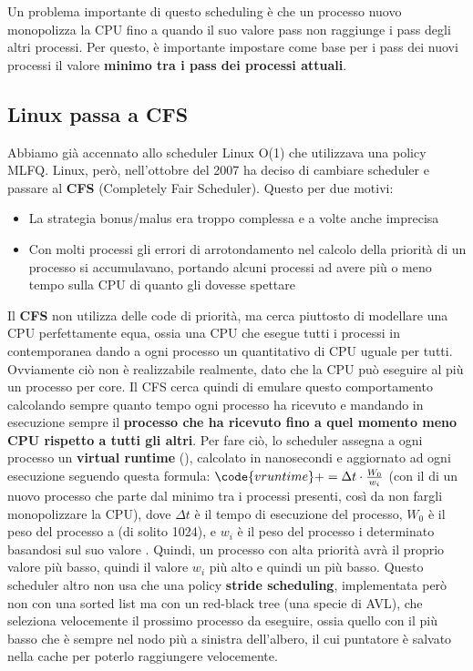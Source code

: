 \documentclass[11pt, a4paper, titlepage, oneside]{scrbook}
\begin{document}
Un problema importante di questo scheduling è che un processo nuovo monopolizza la CPU fino a quando il suo valore pass non raggiunge i pass degli altri processi. Per questo, è importante impostare come base per i pass dei nuovi processi il valore \textbf{minimo tra i pass dei processi attuali}.

\subsection{Linux passa a CFS}

Abbiamo già accennato allo scheduler Linux O(1) che utilizzava una policy MLFQ. Linux, però, nell'ottobre del 2007 ha deciso di cambiare scheduler e passare al \textbf{CFS} (Completely Fair Scheduler). Questo per due motivi:
\begin{itemize}
    \item La strategia bonus/malus era troppo complessa e a volte anche imprecisa
    \item Con molti processi gli errori di arrotondamento nel calcolo della priorità di un processo si accumulavano, portando alcuni processi ad avere più o meno tempo sulla CPU di quanto gli dovesse spettare
\end{itemize}

Il \textbf{CFS} non utilizza delle code di priorità, ma cerca piuttosto di modellare una CPU perfettamente equa, ossia una CPU che esegue tutti i processi in contemporanea dando a ogni processo un quantitativo di CPU uguale per tutti. Ovviamente ciò non è realizzabile realmente, dato che la CPU può eseguire al più un processo per core. Il CFS cerca quindi di emulare questo comportamento calcolando sempre quanto tempo ogni processo ha ricevuto e mandando in esecuzione sempre il \textbf{processo che ha ricevuto fino a quel momento meno CPU rispetto a tutti gli altri}. Per fare ciò, lo scheduler assegna a ogni processo un \textbf{virtual runtime} (), calcolato in nanosecondi e aggiornato ad ogni esecuzione seguendo questa formula: $\code{vruntime} += \Delta t \cdot \frac{W_0}{w_i} $ (con il  di un nuovo processo che parte dal minimo  tra i processi presenti, così da non fargli monopolizzare la CPU), dove $\Delta t$ è il tempo di esecuzione del processo, $W_0$ è il peso del processo a  (di solito 1024), e $w_i$ è il peso del processo i determinato basandosi sul suo valore . Quindi, un processo con alta priorità avrà il proprio valore  più basso, quindi il valore $w_i$ più alto e quindi un  più basso. Questo scheduler altro non usa che una policy \textbf{stride scheduling}, implementata però non con una sorted list ma con un red-black tree (una specie di AVL), che seleziona velocemente il prossimo processo da eseguire, ossia quello con il  più basso che è sempre nel nodo più a sinistra dell'albero, il cui puntatore è salvato nella cache per poterlo raggiungere velocemente. 
\end{document}
